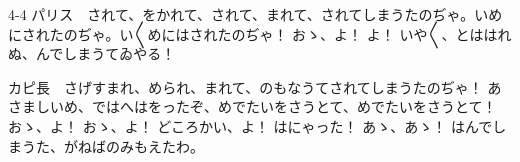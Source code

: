 \documentclass[tate,paper=b6j,jafontsize=9pt]{jlreq}
\begin{document}
\begin{azconvIndented}{4\zw}{-4\zw}
パリス　されて、をかれて、されて、まれて、されてしまうたのぢゃ。いめにされたのぢゃ。い{〳〵}めにはされたのぢゃ！ おゝ、よ！ よ！ いや{〳〵}、とははれぬ、んでしまうてゐやる！

カピ長　さげすまれ、められ、まれて、のもなうてされてしまうたのぢゃ！ あさましいめ、ではへはをったぞ、めでたいをさうとて、めでたいをさうとて！ おゝ、よ！ おゝ、よ！ どころかい、よ！ はにゃった！ あゝ、あゝ！ はんでしまうた、がねばのみもえたわ。


\end{azconvIndented}
\end{document}
